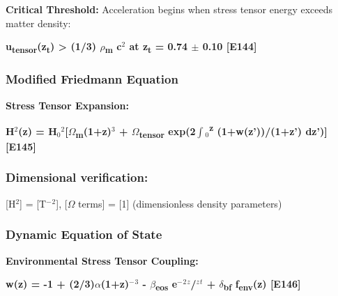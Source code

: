 \documentclass[11pt,a4paper]{article}
\begin{document}
\textbf{Critical Threshold:} Acceleration begins when stress tensor energy exceeds matter density:

\textbf{u\textsubscript{tensor}(z\textsubscript{t}) > (1/\allowbreak{}3) $\rho$\textsubscript{m} c$^{2}$ at z\textsubscript{t} = 0.74 $\pm$ 0.10 [E144]}

\subsubsection{Modified Friedmann Equation}
\textbf{Stress Tensor Expansion:}

\textbf{H$^{2}$(z) = H$_{0}$$^{2}$[$\Omega$\textsubscript{m}(1+z)$^{3}$ + $\Omega$\textsubscript{tensor} exp(2$\int$$_{0}$\textsuperscript{z} (1+w(z'))/(1+z') dz')] [E145]}

\begin{mdframed}[linecolor=accent,linewidth=0.5pt,backgroundcolor=callout-bg,leftline=true,rightline=true,topline=true,bottomline=true,innerleftmargin=8pt,innerrightmargin=8pt,innertopmargin=6pt,innerbottommargin=6pt]
\subsubsection{Dimensional verification:}
[H$^{2}$] = [T$^{-}$$^{2}$], [$\Omega$ terms] = [1] (dimensionless density parameters) \checkmark{}
\end{mdframed}

\subsubsection{Dynamic Equation of State}
\textbf{Environmental Stress Tensor Coupling:}

\textbf{w(z) = -1 + (2/\allowbreak{}3)$\alpha$(1+z)$^{-}$$^{3}$ - $\beta$\textsubscript{eos} e$^{-}$$^{2}$$^{z}$/$^{z}$$^{t}$ + $\delta$\textsubscript{bf} f\textsubscript{env}(z) [E146]}
\end{document}
